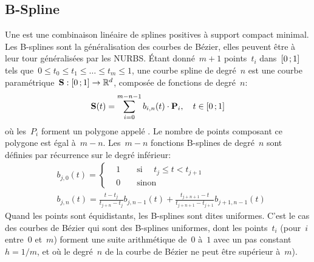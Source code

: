 \subsection{B-Spline}
Une  est une combinaison linéaire de splines positives à support compact minimal. Les B-splines sont la généralisation des courbes de Bézier, elles peuvent être à leur tour généralisées par les NURBS. Étant donné~$m+1$ points~$t_i$ dans~$\mathopen{[}0\,;1\mathclose{]}$ tels que~$0\le t_0\le t_1\le\ldots\le t_m\le 1$, une courbe spline de degré~$n$ est une courbe paramétrique~$\mathbf{S}:\mathopen{[}0\,;1\mathclose{]}\to\mathbb{R}^d$, composée de fonctions  de degré~$n$: 
\begin{equation}
\mathbf{S}(t)=\sum_{i=0}^{m-n-1}b_{i,n}(t)\cdot\mathbf{P}_{i},\quad t \in \mathopen{[}0\,;1\mathclose{]}
\end{equation}
où les~$P_i$ forment un polygone appelé . Le nombre de points composant ce polygone est égal à~$m-n$. Les~$m-n$ fonctions B-splines de degré~$n$ sont définies par récurrence sur le degré inférieur: 
\begin{align}
&b_{j, 0}(t)= \left\{ 
\begin{aligned} &1 && \text{ si } \quad t_j \leqslant t < t_{j + 1} \\
&0 && \text{ sinon } 
\end{aligned} \right.\\
&b_{j, n}(t)= \frac{t - t_j}{t_{j + n} - t_j} b_{j, n - 1}(t) + \frac{t_{j + n + 1} - t}{t_{j + n + 1} - t_{j + 1}} b_{j + 1, n - 1}(t)
\end{align}
Quand les points sont équidistants, les B-splines sont dites uniformes. C'est le cas des courbes de Bézier qui sont des B-splines uniformes, dont les points~$t_i$ (pour~$i$ entre~$0$ et~$m$) forment une suite arithmétique de~$0$ à~$1$ avec un pas constant~$h=1/m$, et où le degré~$n$ de la courbe de Bézier ne peut être supérieur à~$m$). 

 
 
